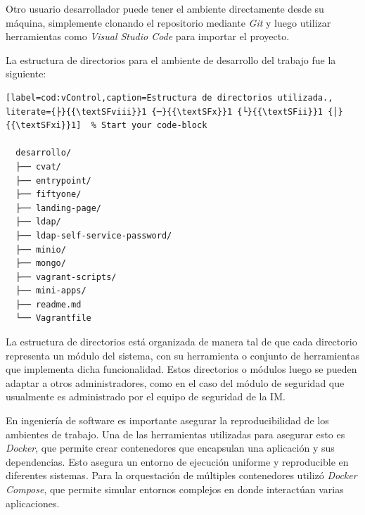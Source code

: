Otro usuario desarrollador puede tener el ambiente directamente desde su máquina, simplemente clonando el repositorio \citep{bruno_masoller_brunomaso1uba-ceia_nodate} mediante \textit{Git} y luego utilizar herramientas como \textit{Visual Studio Code} \citep{microsoft_documentation_nodate} para importar el proyecto.

La estructura de directorios para el ambiente de desarrollo del trabajo fue la siguiente:

%
%

%
%

\begin{lstlisting}[label=cod:vControl,caption=Estructura de directorios utilizada., literate={├}{{\textSFviii}}1 {─}{{\textSFx}}1 {└}{{\textSFii}}1 {│}{{\textSFxi}}1]  % Start your code-block

  desarrollo/
  ├── cvat/
  ├── entrypoint/
  ├── fiftyone/
  ├── landing-page/
  ├── ldap/
  ├── ldap-self-service-password/
  ├── minio/
  ├── mongo/
  ├── vagrant-scripts/
  ├── mini-apps/
  ├── readme.md
  └── Vagrantfile

\end{lstlisting}

La estructura de directorios está organizada de manera tal de que cada directorio representa un módulo del sistema, con su herramienta o conjunto de herramientas que implementa dicha funcionalidad. Estos directorios o módulos luego se pueden adaptar a otros administradores, como en el caso del módulo de seguridad que usualmente es administrado por el equipo de seguridad de la IM.

En ingeniería de software es importante asegurar la reproducibilidad de los ambientes de trabajo. Una de las herramientas utilizadas para asegurar esto es \textit{Docker}, que permite crear contenedores que encapsulan una aplicación y sus dependencias. Esto asegura un entorno de ejecución uniforme y reproducible en diferentes sistemas. Para la orquestación de múltiples contenedores utilizó \textit{Docker Compose}, que permite simular entornos complejos en donde interactúan varias aplicaciones.


